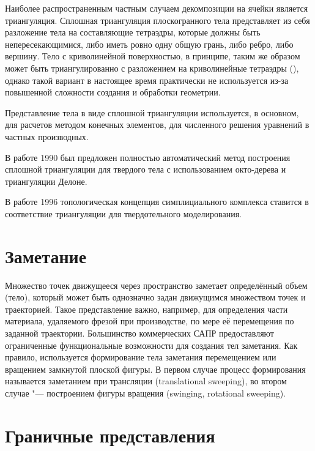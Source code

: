 {{{{{Наиболее распространенным частным случаем декомпозиции на ячейки является триангуляция. Сплошная триангуляция плоскогранного тела представляет из себя разложение тела на составляющие тетраэдры, которые должны быть непересекающимися, либо иметь ровно одну общую грань, либо ребро, либо вершину. Тело с криволинейной поверхностью, в принципе, таким же образом может быть триангулированно с разложением на криволинейные тетраэдры (), однако такой вариант в настоящее время практически не используется из-за повышенной сложности создания и обработки геометрии.

Представление тела в виде сплошной триангуляции используется, в основном, для расчетов методом конечных элементов, для численного решения уравнений в частных производных.

В работе \cite{A combined octree/Delaunay method for fully automatic 3-d mesh generation} 1990 был предложен полностью автоматический метод построения сплошной триангуляции для твердого тела с использованием окто-дерева и триангуляции Делоне.

В работе \cite{Modeling with Simplicial Complexes} 1996 топологическая концепция симплициального комплекса ставится в соответствие триангуляции для твердотельного моделирования. 



\section{Заметание} \label{sect_sweeping}

Множество точек движущееся через пространство заметает определённый объем (тело), который может быть однозначно задан движущимся множеством точек и траекторией. Такое представление важно, например, для определения части материала, удаляемого фрезой при производстве, по мере её перемещения по заданной траектории. Большинство коммерческих САПР предоставляют ограниченные функциональные возможности для создания тел заметания. Как правило, используется формирование тела заметания перемещением или вращением замкнутой плоской фигуры. В первом случае процесс формирования называется заметанием при трансляции (translational sweeping), во втором случае "--- построением фигуры вращения (swinging, rotational sweeping).

\section{Граничные представления} \label{sect_boundary_rep}

}}}}}
